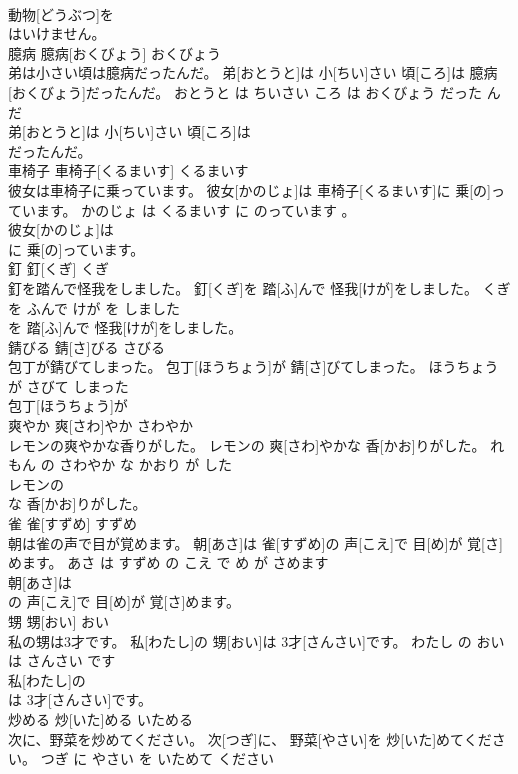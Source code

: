 \documentclass[8pt]{extreport}
\begin{document}
\begin{CJK}{UTF8}{min}
\\	動物[どうぶつ]を
\\	はいけません。			
\\	臆病	臆病[おくびょう]	おくびょう	
\\	弟は小さい頃は臆病だったんだ。	弟[おとうと]は 小[ちい]さい 頃[ころ]は 臆病[おくびょう]だったんだ。	おとうと は ちいさい ころ は おくびょう だった ん だ	
\\	弟[おとうと]は 小[ちい]さい 頃[ころ]は
\\	だったんだ。			
\\	車椅子	車椅子[くるまいす]	くるまいす	
\\	彼女は車椅子に乗っています。	彼女[かのじょ]は 車椅子[くるまいす]に 乗[の]っています。	かのじょ は くるまいす に のっています 。	
\\	彼女[かのじょ]は
\\	に 乗[の]っています。			
\\	釘	釘[くぎ]	くぎ	
\\	釘を踏んで怪我をしました。	釘[くぎ]を 踏[ふ]んで 怪我[けが]をしました。	くぎ を ふんで けが を しました	
\\	を 踏[ふ]んで 怪我[けが]をしました。			
\\	錆びる	錆[さ]びる	さびる	
\\	包丁が錆びてしまった。	包丁[ほうちょう]が 錆[さ]びてしまった。	ほうちょう が さびて しまった	
\\	包丁[ほうちょう]が
\\	爽やか	爽[さわ]やか	さわやか	
\\	レモンの爽やかな香りがした。	レモンの 爽[さわ]やかな 香[かお]りがした。	れもん の さわやか な かおり が した	
\\	レモンの
\\	な 香[かお]りがした。			
\\	雀	雀[すずめ]	すずめ	
\\	朝は雀の声で目が覚めます。	朝[あさ]は 雀[すずめ]の 声[こえ]で 目[め]が 覚[さ]めます。	あさ は すずめ の こえ で め が さめます	
\\	朝[あさ]は
\\	の 声[こえ]で 目[め]が 覚[さ]めます。			
\\	甥	甥[おい]	おい	
\\	私の甥は3才です。	私[わたし]の 甥[おい]は 3才[さんさい]です。	わたし の おい は さんさい です	
\\	私[わたし]の
\\	は 3才[さんさい]です。			
\\	炒める	炒[いた]める	いためる	
\\	次に、野菜を炒めてください。	次[つぎ]に、 野菜[やさい]を 炒[いた]めてください。	つぎ に やさい を いためて ください	

\end{CJK}
\end{document}
